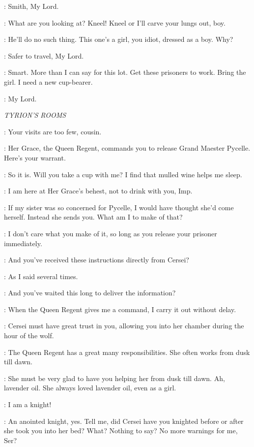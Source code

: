 \GENDRY: Smith, My Lord. 

\POLLIVER:  What are you looking at? Kneel! Kneel or I'll carve your lungs out, boy. 

\TYWIN: He'll do no such thing. This one's a girl, you idiot, dressed as a boy. Why? 

\ARYA: Safer to travel, My Lord. 

\TYWIN: Smart. More than I can say for this lot. Get these prisoners to work. Bring the girl. I need a new cup-bearer. 

\MOUNTAIN: My Lord. 


\scene

\textit{TYRION'S ROOMS} 


\TYRION: Your visits are too few, cousin. 

\LANCEL: Her Grace, the Queen Regent, commands you to release Grand Maester Pycelle. Here's your warrant. 

\TYRION: So it is. Will you take a cup with me? I find that mulled wine helps me sleep. 

\LANCEL: I am here at Her Grace's behest, not to drink with you, Imp. 

\TYRION: If my sister was so concerned for Pycelle, I would have thought she'd come herself. Instead she sends you. What am I to make of that? 

\LANCEL: I don't care what you make of it, so long as you release your prisoner immediately. 

\TYRION: And you've received these instructions directly from Cersei? 

\LANCEL: As I said several times. 

\TYRION: And you've waited this long to deliver the information? 

\LANCEL: When the Queen Regent gives me a command, I carry it out without delay. 

\TYRION: Cersei must have great trust in you, allowing you into her chamber during the hour of the wolf. 

\LANCEL: The Queen Regent has a great many responsibilities. She often works from dusk till dawn. 

\TYRION: She must be very glad to have you helping her from dusk till dawn. Ah, lavender oil. She always loved lavender oil, even as a girl. 

\LANCEL: I am a knight! 

\TYRION: An anointed knight, yes. Tell me, did Cersei have you knighted before or after she took you into her bed? What? Nothing to say? No more warnings for me, Ser? 

